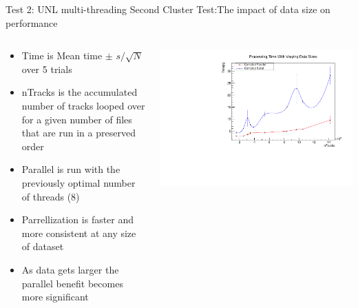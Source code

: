 \documentclass[10pt]{beamer}
\begin{document}
\begin{frame}{Test 2: UNL multi-threading}
Second Cluster Test:The impact of data size on performance\\
\begin{columns}
	\begin{column}{0.5\textwidth}
		\scriptsize
	\begin{itemize}
		\item Time is Mean time $\pm$ $s/\sqrt{N}$ over 5 trials
		\item nTracks is the accumulated number of tracks looped over for a given number of files that are run in a preserved order
		\item Parallel is run with the previously optimal number of threads (8)
		\item Parrellization is faster and more consistent at any size of dataset 
		\item As data gets larger the parallel benefit becomes more significant
	\end{itemize}
	\end{column}
	\begin{column}{0.5\textwidth}
   		\includegraphics[scale=0.3, left]{../ParTree_t3/sizetestt3.pdf}
	\end{column}
\end{columns}

\end{frame}
\end{document}
